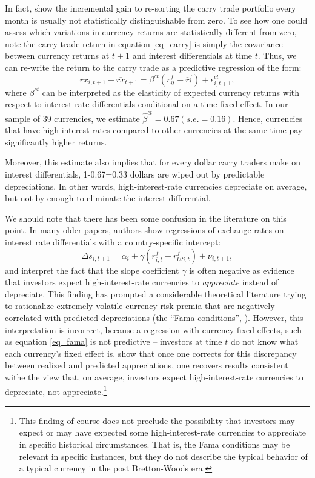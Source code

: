 \documentclass{ar-1col}
\begin{document}
In fact, \citet{HassanMano2019} show the incremental gain to re-sorting the carry trade portfolio every month is usually not statistically distinguishable from zero. To see how one could assess which variations in currency returns are statistically different from zero, note the carry trade return in equation \ref{eq_carry} is simply the covariance between currency returns at $t+1$ and interest differentials at time $t$. Thus, we can re-write the return to the carry trade as a predictive regression of the form:
\begin{equation}
    rx_{i,t+1} - \overline{rx}_{t+1} 
    = \beta^{ct}\left( r^f_{it}-\overline{r}^f_{t}\right) +\epsilon_{i,t+1}^{ct},  \label{eq_ct}
\end{equation} 
where $\beta ^{ct}$ can be interpreted as the elasticity of expected currency returns with respect to interest rate differentials conditional on a time fixed effect. In our sample of 39 currencies, we estimate $\hat{\beta}^{ct}=0.67 (s.e.=0.16)$. Hence, currencies that have high interest rates compared to other currencies at the same time pay significantly higher returns.

Moreover, this estimate also implies that for every dollar carry traders make on interest differentials, 1-0.67=0.33 dollars are wiped out by predictable depreciations. In other words, high-interest-rate currencies depreciate on average, but not by enough to eliminate the interest differential.

We should note that there has been some confusion in the literature on this point. In many older papers, authors show regressions of exchange rates on interest rate differentials with a country-specific intercept:
\begin{equation}
    \Delta s_{i,t+1} 
    = \alpha_i + \gamma \left(r^f_{i, t} - r^f_{US, t}\right) + \nu_{i, t+1},
\label{eq_fama} 
\end{equation}
and interpret the fact that the slope coefficient $\gamma$ is often negative as evidence that investors expect high-interest-rate currencies to \textit{appreciate} instead of depreciate. This finding has prompted a considerable theoretical literature trying to rationalize extremely volatile currency risk premia that are negatively correlated with predicted depreciations (the ``Fama conditions'', \citet{Backusetal2001}). However, this interpretation is incorrect, because a regression with currency fixed effects, such as equation \ref{eq_fama} is not predictive -- investors at time $t$ do not know what each currency's fixed effect is. \citet{HassanMano2019} show that once one corrects for this discrepancy between realized and predicted appreciations, one recovers results consistent withe the view that, on average, investors expect high-interest-rate currencies to depreciate, not appreciate.\footnote{This finding of course does not preclude the possibility that investors may expect or may have expected some high-interest-rate currencies to appreciate in specific historical circumstances. That is, the Fama conditions may be relevant in specific instances, but they do not describe the typical behavior of a typical currency in the post Bretton-Woods era.}
\end{document}
